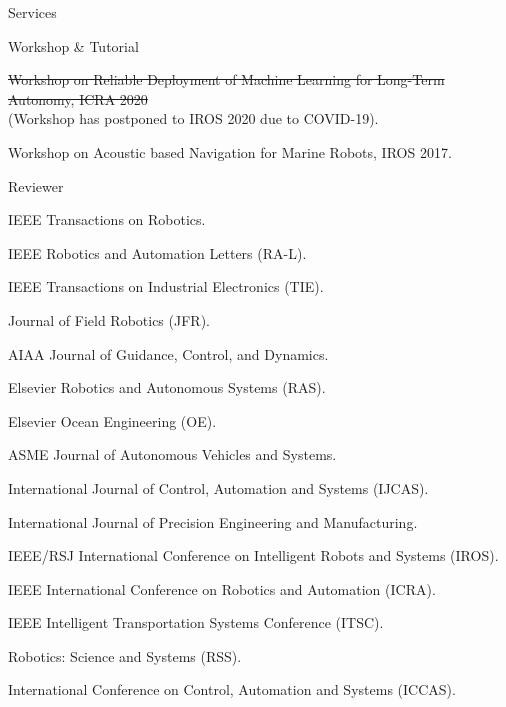 \begin{rSection}{Services}
\begin{rSubsection}{Workshop \& Tutorial}{}{}{}
  \item \sout{Workshop on Reliable Deployment of Machine Learning for Long-Term Autonomy, ICRA 2020}\\
  (Workshop has postponed to IROS 2020 due to COVID-19).
  \item Workshop on Acoustic based Navigation for Marine Robots, IROS 2017.
\end{rSubsection}

\begin{rSubsection}{Reviewer}{}{}{}
  \item IEEE Transactions on Robotics.
  \item IEEE Robotics and Automation Letters (RA-L).
  \item IEEE Transactions on Industrial Electronics (TIE).
  \item Journal of Field Robotics (JFR).
  \item AIAA Journal of Guidance, Control, and Dynamics.
  \item Elsevier Robotics and Autonomous Systems (RAS).
  \item Elsevier Ocean Engineering (OE).
  \item ASME Journal of Autonomous Vehicles and Systems.
  \item International Journal of Control, Automation and Systems (IJCAS).
  \item International Journal of Precision Engineering and Manufacturing.
  \item IEEE/RSJ International Conference on Intelligent Robots and Systems (IROS).
  \item IEEE International Conference on Robotics and Automation (ICRA).
  \item IEEE Intelligent Transportation Systems Conference (ITSC).
  \item Robotics: Science and Systems (RSS).
  \item International Conference on Control, Automation and Systems (ICCAS).
\end{rSubsection}


\end{rSection}
